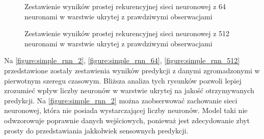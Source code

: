 \documentclass[10pt,a4paper]{article}
\begin{document}
\FloatBarrier
 \begin{figure}[!ht]
	\centering
	\caption{Zestawienie wyników prostej rekurencyjnej sieci neuronowej z 64 neuronami w warstwie ukrytej z prawdziwymi obserwacjami}
	\label{figure:simple_rnn_64}
\end{figure}
\FloatBarrier
 \begin{figure}[!ht]
	\centering
	\caption{Zestawienie wyników prostej rekurencyjnej sieci neuronowej z 512 neuronami w warstwie ukrytej z prawdziwymi obserwacjami}
	\label{figure:simple_rnn_512}
\end{figure}
\FloatBarrier

Na \autoref{figure:simple_rnn_2}, \autoref{figure:simple_rnn_64}, \autoref{figure:simple_rnn_512} przedstawione zostały zestawienia wyników predykcji z danymi zgromadzonymi w pierwotnym szeregu czasowym. Bliższa analiza tych rysunków pozwoli lepiej zrozumieć wpływ liczby neuronów w warstwie ukrytej na jakość otrzymywanych predykcji. Na \autoref{figure:simple_rnn_2} można zaobserwować zachowanie sieci neuronowej, która nie posiada wystarczającej liczby neuronów. Model taki nie odwzorowuje poprawnie danych wejściowych, ponieważ jest zdecydowanie zbyt prosty do przedstawiania jakkolwiek sensownych predykcji. 
\end{document}

